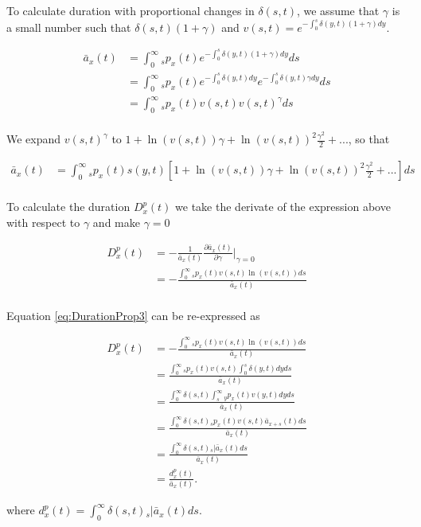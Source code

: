 \documentclass[12pt]{article}
\begin{document}
To calculate duration with proportional changes in $\delta(s,t)$, we assume that $\gamma$ is a small number such that $\delta(s,t)(1+\gamma)$ and  ${v}(s,t)=e^{-\int_0^{s}  \delta(y,t)(1+\gamma)dy}$.


\begin{equation}\label{eq:DurationProp1}
\begin{split}
\bar{a} _x(t) &= \int_0^\infty {}_sp_x(t) e^{-\int_0^{s}\delta(y,t)(1+\gamma)dy}ds \\
&= \int_0^\infty {}_sp_x(t) e^{-\int_0^{s}\delta(y,t)dy}e^{-\int_0^{s}\delta(y,t)\gamma dy}ds \\
&= \int_0^\infty {}_sp_x(t) v(s,t)v(s,t)^{\gamma}ds \\
\end{split}
\end{equation}


We expand $v(s,t)^{\gamma}$ to $1+\ln(v(s,t)) \gamma+{\ln(v(s,t))}^2 \frac{\gamma^2}{2}+...$, so that


\begin{equation}\label{eq:DurationProp2}
\begin{split}
\bar{a}_x(t) &= \int_0^\infty {}_sp_x(t) s(y,t)[1+\ln(v(s,t)) \gamma+{\ln(v(s,t))}^2 \frac{\gamma^2}{2}+...]ds\\
\end{split}
\end{equation}


To calculate the duration ${D}^{p}_{x}(t)$ we take the derivate of the expression above with respect to $\gamma$ and make $\gamma=0$

\begin{equation}\label{eq:DurationProp3}
\begin{split}
{D}^{p}_{x}(t)&=-\frac{1}{\bar{a}_x(t)}\frac{\partial \bar{a}_x(t)}{\partial \gamma} \bigg\rvert_{\gamma=0} \\
&= -\frac{\int_0^\infty {}_sp_x(t) v(s,t) \ln(v(s,t))ds}{\bar{a}_x(t)} \\
\end{split}
\end{equation}


Equation \ref{eq:DurationProp3} can be re-expressed as 


\begin{equation}\label{eq:DurationProp4}
\begin{split}
{D}^{p}_{x}(t) &= -\frac{\int_0^\infty {}_sp_x(t) v(s,t) \ln(v(s,t))ds}{\bar{a}_x(t)}\\
&= \frac{\int_0^\infty {}_sp_x(t) v(s,t) \int_0^{s} \delta(y,t)dy ds }{\bar{a}_x(t)}\\
&= \frac{\int_0^\infty \delta(s,t)  \int_{s}^{\infty} {}_{y}p_x(t) v(y,t)dy ds }{\bar{a}_x(t)}\\
&= \frac{\int_0^\infty \delta(s,t) {}_sp_x(t) v(s,t) \bar{a}_{x+s}(t)  ds }{\bar{a}_x(t)}\\
&= \frac{\int_0^\infty \delta(s,t) {}_s|\bar{a}_x(t) ds}{\bar{a}_x(t)} \\
&= \frac{{d}^{p}_{x}(t)}{\bar{a}_x(t)}.
\end{split}
\end{equation}



where ${d}^{p}_{x}(t)=\int_0^\infty \delta(s,t) {}_s|\bar{a}_x(t) ds$.
\end{document}

